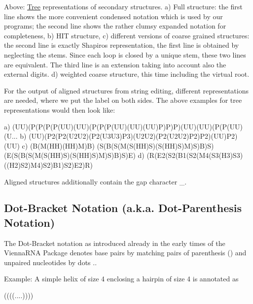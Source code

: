 Above\+: \hyperlink{structTree}{Tree} representations of secondary structures. a) Full structure\+: the first line shows the more convenient condensed notation which is used by our programs; the second line shows the rather clumsy expanded notation for completeness, b) H\+IT structure, c) different versions of coarse grained structures\+: the second line is exactly Shapiro\textquotesingle{}s representation, the first line is obtained by neglecting the stems. Since each loop is closed by a unique stem, these two lines are equivalent. The third line is an extension taking into account also the external digits. d) weighted coarse structure, this time including the virtual root.

For the output of aligned structures from string editing, different representations are needed, where we put the label on both sides. The above examples for tree representations would then look like\+:

\begin{DoxyVerb}a) (UU)(P(P(P(P(UU)(UU)(P(P(P(UU)(UU)(UU)P)P)P)(UU)(UU)(P(P(UU)(U...
b) (UU)(P2(P2(U2U2)(P2(U3U3)P3)(U2U2)(P2(U2U2)P2)P2)(UU)P2)(UU)
c) (B(M(HH)(HH)M)B)
   (S(B(S(M(S(HH)S)(S(HH)S)M)S)B)S)
   (E(S(B(S(M(S(HH)S)(S(HH)S)M)S)B)S)E)
d) (R(E2(S2(B1(S2(M4(S3(H3)S3)((H2)S2)M4)S2)B1)S2)E2)R)
\end{DoxyVerb}


Aligned structures additionally contain the gap character \textquotesingle{}\+\_\+\textquotesingle{}.\hypertarget{rna_structure_notations_dot-bracket-notation}{}\subsection{Dot-\/\+Bracket Notation (a.\+k.\+a. Dot-\/\+Parenthesis Notation)}\label{rna_structure_notations_dot-bracket-notation}
The Dot-\/\+Bracket notation as introduced already in the early times of the Vienna\+R\+NA Package denotes base pairs by matching pairs of parenthesis {\ttfamily ()} and unpaired nucleotides by dots {\ttfamily .}.

Example\+: A simple helix of size 4 enclosing a hairpin of size 4 is annotated as \begin{DoxyVerb}((((....))))
\end{DoxyVerb}


